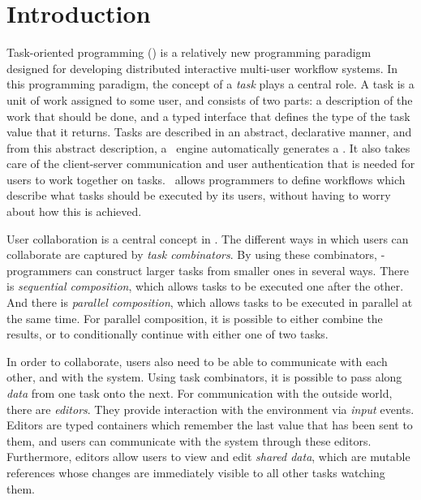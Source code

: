 \section[sec:introduction]{Introduction}

Task-oriented programming (\TOP) is a relatively new programming paradigm designed for developing distributed interactive multi-user workflow systems.
In this programming paradigm, the concept of a \emph{task} plays a central role.
A task is a unit of work assigned to some user, and consists of two parts: a description of the work that should be done, and a typed interface that defines the type of the task value that it returns.
Tasks are described in an abstract, declarative manner, and from this abstract description, a \TOP\ engine automatically generates a \GUI.
It also takes care of the client-server communication and user authentication that is needed for users to work together on tasks.
\TOP\ allows programmers to define workflows which describe what tasks should be executed by its users, without having to worry about how this is achieved.



User collaboration is a central concept in \TOP.
The different ways in which users can collaborate are captured by \emph{task combinators}.
By using these combinators, \TOP-programmers can construct larger tasks from smaller ones in several ways.
There is \emph{sequential composition}, which allows tasks to be executed one after the other.
And there is \emph{parallel composition}, which allows tasks to be executed in parallel at the same time.
For parallel composition, it is possible to either combine the results, or to conditionally continue with either one of two tasks.

In order to collaborate, users also need to be able to communicate with each other, and with the system.
Using task combinators, it is possible to pass along \emph{data} from one task onto the next.
For communication with the outside world, there are \emph{editors}.
They provide interaction with the environment via \emph{input} events.
Editors are typed containers which remember the last value that has been sent to them, and users can communicate with the system through these editors.
Furthermore, editors allow users to view and edit \emph{shared data}, which are mutable references whose changes are immediately visible to all other tasks watching them.

